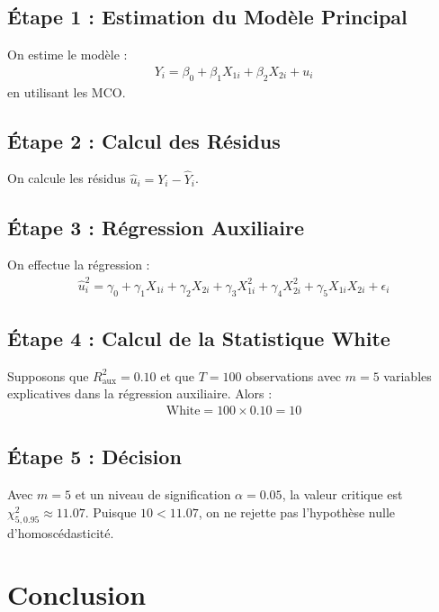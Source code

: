 \documentclass[14pt]{extarticle} %
\theoremstyle{definition}
\theoremstyle{plain}
\begin{document}
\subsection{Étape 1 : Estimation du Modèle Principal}

On estime le modèle :
\begin{align*}
    Y_i = \beta_0 + \beta_1 X_{1i} + \beta_2 X_{2i} + u_i
\end{align*}
en utilisant les MCO.

\subsection{Étape 2 : Calcul des Résidus}

On calcule les résidus $\hat{u}_i = Y_i - \hat{Y}_i$.

\subsection{Étape 3 : Régression Auxiliaire}

On effectue la régression :
\begin{align*}
    \hat{u}_i^2 = \gamma_0 + \gamma_1 X_{1i} + \gamma_2 X_{2i} + \gamma_3 X_{1i}^2 + \gamma_4 X_{2i}^2 + \gamma_5 X_{1i}X_{2i} + \epsilon_i
\end{align*}

\subsection{Étape 4 : Calcul de la Statistique White}

Supposons que $R^2_{\text{aux}} = 0.10$ et que $T = 100$ observations avec $m = 5$ variables explicatives dans la régression auxiliaire. Alors :
\begin{align*}
    \text{White} = 100 \times 0.10 = 10
\end{align*}

\subsection{Étape 5 : Décision}

Avec $m = 5$ et un niveau de signification $\alpha = 0.05$, la valeur critique est $\chi^2_{5, 0.95} \approx 11.07$. Puisque $10 < 11.07$, on ne rejette pas l'hypothèse nulle d'homoscédasticité.

\section{Conclusion}
\end{document}
